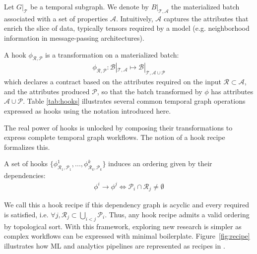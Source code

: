 \begin{definition} Let $G|_{\mathcal{T}}$ be a temporal subgraph. We denote by $B|_{\mathcal{T}, \mathcal{A}}$ the materialized batch associated with a set of properties $\mathcal{A}$. Intuitively, $\mathcal{A}$ captures the attributes that enrich the slice of data, typically tensors required by a model (e.g. neighborhood information in message-passing architectures). 
\end{definition}


\begin{definition}[Hook] A hook $\phi_{\mathcal{R}, \mathcal{P}}$ is a transformation on a materialized batch:
\begin{align}
    \phi_{\mathcal{R}, \mathcal{P}}: \mathcal{B}|_{\mathcal{T}, \mathcal{A}} \mapsto \mathcal{B}|_{\mathcal{T}, \mathcal{A} \cup \mathcal{P}}
\end{align}
which declares a contract based on the attributes required on the input $\mathcal{R} \subset \mathcal{A}$, and the attributes produced $\mathcal{P}$, so that the batch transformed by $\phi$ has attributes $\mathcal{A} \cup \mathcal{P}$. Table \ref{tab:hooks} illustrates several common temporal graph operations expressed as hooks using the notation introduced here.
\end{definition}

The real power of hooks is unlocked by composing their transformations to express complete temporal graph workflows. The notion of a hook recipe formalizes this.


\begin{definition} A set of hooks $\{\phi^1_{\mathcal{R}_1, \mathcal{P}_1}, ..., \phi^k_{\mathcal{R}_k, \mathcal{P}_k}\}$ induces an ordering given by their dependencies:
\begin{align}
    \phi^i \to  \phi^j \iff \mathcal{P}_i\cap \mathcal{R}_j \neq \emptyset
\end{align}

We call this a hook recipe if this dependency graph is acyclic and every required is satisfied, i.e. $\forall j, \mathcal{R}_j \subset \bigcup_{i < j} \mathcal{P}_i$. Thus, any hook recipe admits a valid ordering by topological sort.
With this framework, exploring new research is simpler as complex workflows can be expressed with minimal boilerplate. Figure~\ref{fig:recipe} illustrates how ML and analytics pipelines are represented as recipes in \name.
\end{definition}



